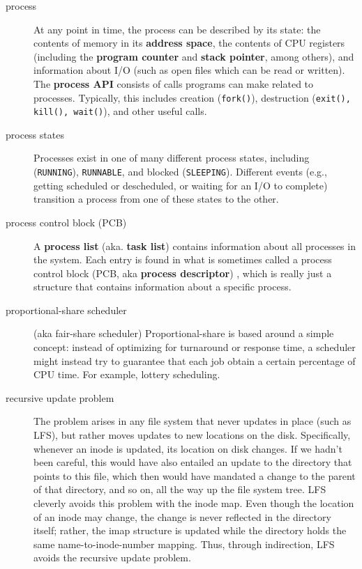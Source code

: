\begin{description}
\item[process] At any point in time, the process can be described by its state: the contents of memory in its \textbf{address space}, the contents of CPU registers (including the \textbf{program counter} and \textbf{stack pointer}, among others), and information about I/O (such as open files which can be read or written). The \textbf{process API} consists of calls programs can make related to processes. Typically, this includes creation (\texttt{fork()}), destruction (\texttt{exit(), kill(), wait()}), and other useful calls.

\item[process states] Processes exist in one of many different process states, including  (\texttt{RUNNING}),  \texttt{RUNNABLE}, and blocked (\texttt{SLEEPING}). Different events (e.g., getting scheduled or descheduled, or waiting for an I/O to complete) transition a process from one of these states to the other.

\item[process control block (PCB)] A \textbf{process list} (aka. \textbf{task list}) contains information about all processes in the system. Each entry is found in what is sometimes called a process control block (PCB, aka \textbf{process descriptor}) , which is really just a structure that contains information about a specific process.

\item[proportional-share scheduler] (aka fair-share scheduler) Proportional-share is based around a simple concept: instead of optimizing for turnaround or response time, a scheduler might instead try to guarantee that each job obtain a certain percentage of CPU time. For example, lottery scheduling.

\item[recursive update problem]  The problem arises in any file system that never updates in place (such as LFS), but rather moves updates to new locations on the disk. Specifically, whenever an inode is updated, its location on disk changes. If we hadn’t been careful, this would have also entailed an update to
the directory that points to this file, which then would have mandated
a change to the parent of that directory, and so on, all the way up the file
system tree. LFS cleverly avoids this problem with the inode map. Even though
the location of an inode may change, the change is never reflected in the
directory itself; rather, the imap structure is updated while the directory
holds the same name-to-inode-number mapping. Thus, through indirection, LFS avoids the recursive update problem.


\end{description}
